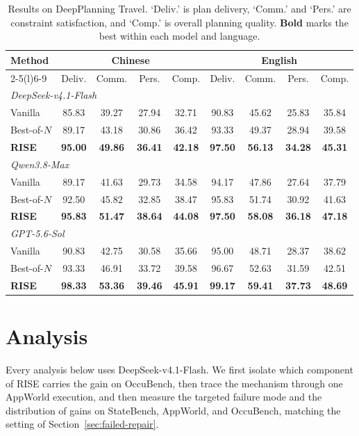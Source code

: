 \documentclass{article}
\newcommand{\method}{RISE\xspace}
\begin{document}
\begin{table}[t]
\centering
\small
\setlength{\tabcolsep}{4.5pt}
\caption{Results on DeepPlanning Travel. `Deliv.' is plan delivery, `Comm.' and `Pers.' are constraint satisfaction, and `Comp.' is overall planning quality. \textbf{Bold} marks the best within each model and language.}
\label{tab:deepplanning}
\begin{tabular}{lcccccccc}
\toprule
\multirow{2}{*}{Method} & \multicolumn{4}{c}{Chinese} & \multicolumn{4}{c}{English} \\
\cmidrule(lr){2-5}\cmidrule(l){6-9}
 & Deliv. & Comm. & Pers. & Comp. & Deliv. & Comm. & Pers. & Comp. \\
\midrule
\multicolumn{9}{l}{\textit{DeepSeek-v4.1-Flash}} \\
Vanilla & 85.83 & 39.27 & 27.94 & 32.71 & 90.83 & 45.62 & 25.83 & 35.84 \\
\mbox{Best-of-$N$} & 89.17 & 43.18 & 30.86 & 36.42 & 93.33 & 49.37 & 28.94 & 39.58 \\
\textbf{\method} & \textbf{95.00} & \textbf{49.86} & \textbf{36.41} & \textbf{42.18} & \textbf{97.50} & \textbf{56.13} & \textbf{34.28} & \textbf{45.31} \\
\midrule
\multicolumn{9}{l}{\textit{Qwen3.8-Max}} \\
Vanilla & 89.17 & 41.63 & 29.73 & 34.58 & 94.17 & 47.86 & 27.64 & 37.79 \\
\mbox{Best-of-$N$} & 92.50 & 45.82 & 32.85 & 38.47 & 95.83 & 51.74 & 30.92 & 41.63 \\
\textbf{\method} & \textbf{95.83} & \textbf{51.47} & \textbf{38.64} & \textbf{44.08} & \textbf{97.50} & \textbf{58.08} & \textbf{36.18} & \textbf{47.18} \\
\midrule
\multicolumn{9}{l}{\textit{GPT-5.6-Sol}} \\
Vanilla & 90.83 & 42.75 & 30.58 & 35.66 & 95.00 & 48.71 & 28.37 & 38.62 \\
\mbox{Best-of-$N$} & 93.33 & 46.91 & 33.72 & 39.58 & 96.67 & 52.63 & 31.59 & 42.51 \\
\textbf{\method} & \textbf{98.33} & \textbf{53.36} & \textbf{39.46} & \textbf{45.91} & \textbf{99.17} & \textbf{59.41} & \textbf{37.73} & \textbf{48.69} \\
\bottomrule
\end{tabular}
\end{table}

\section{Analysis}
Every analysis below uses DeepSeek-v4.1-Flash. We first isolate which component of \method carries the gain on OccuBench, then trace the mechanism through one AppWorld execution, and then measure the targeted failure mode and the distribution of gains on StateBench, AppWorld, and OccuBench, matching the setting of Section~\ref{sec:failed-repair}.
\end{document}
